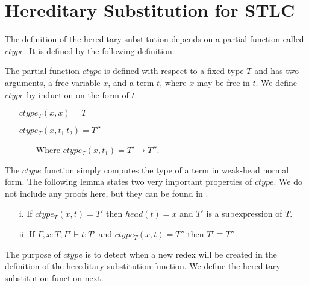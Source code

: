 \section{Hereditary Substitution for STLC}
\label{sec:hereditary_substitution_for_stlc}
The definition of the hereditary substitution depends on a
partial function called $ctype$.  It is defined by the following definition.
\begin{definition}
  \label{def:ctype_stlc}
  The partial function $ctype$ is defined with respect to a fixed type $T$
  and has two arguments, a free variable $x$, and a term $t$, where $x$
  may be free in $t$.  We define $ctype$ by induction on the form of $t$.
  \begin{itemize}
  \item[] $ctype_T(x,x) = T$
  \item[] $ctype_T(x,t_1\ t_2) = T''$
  \item[] \ \ \ \ Where $ctype_T(x,t_1) = T' \to T''$.
  \end{itemize}
\end{definition}
\noindent
The $ctype$ function simply computes the type of a term in weak-head normal form.
The following lemma states two very important properties of $ctype$.  We
do not include any proofs here, but they can be found in \cite{Eades:2011}.
\begin{lemma}
  \label{lemma:ctype_props_stlc}
  \begin{itemize}
  \item[i.] If $ctype_T(x,t) = T'$ then $head(t) = x$ and $T'$ 
    is a subexpression of $T$.
    
  \item[ii.] If $\Gamma,x:T,\Gamma' \vdash t:T'$ and $ctype_T(x,t) = T''$ then
    $T' \equiv T''$.   
  \end{itemize}
\end{lemma}
\noindent
The purpose of $ctype$ is to detect when a new redex will be created in the
definition of the hereditary substitution function. We define the
hereditary substitution function next.
